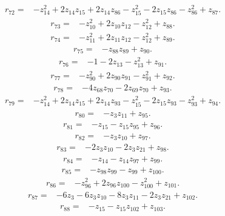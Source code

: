 \begin{align*}
 r_{72}={}&-z_{14}^{2}+2z_{14}z_{15}+2z_{14}z_{86}-z_{15}^{2}-2z_{15}z_{86}-z_{86}^{2}+z_{87} .
\end{align*}
\begin{align*}
 r_{73}={}&-z_{10}^{2}+2z_{10}z_{12}-z_{12}^{2}+z_{88} .
\end{align*}
\begin{align*}
 r_{74}={}&-z_{11}^{2}+2z_{11}z_{12}-z_{12}^{2}+z_{89} .
\end{align*}
\begin{align*}
 r_{75}={}&-z_{88}z_{89}+z_{90} .
\end{align*}
\begin{align*}
 r_{76}={}&-1-2z_{13}-z_{13}^{2}+z_{91} .
\end{align*}
\begin{align*}
 r_{77}={}&-z_{90}^{2}+2z_{90}z_{91}-z_{91}^{2}+z_{92} .
\end{align*}
\begin{align*}
 r_{78}={}&-4z_{68}z_{70}-2z_{69}z_{70}+z_{93} .
\end{align*}
\begin{align*}
 r_{79}={}&-z_{14}^{2}+2z_{14}z_{15}+2z_{14}z_{93}-z_{15}^{2}-2z_{15}z_{93}-z_{93}^{2}+z_{94} .
\end{align*}
\begin{align*}
 r_{80}={}&-z_{3}z_{11}+z_{95} .
\end{align*}
\begin{align*}
 r_{81}={}&-z_{15}-z_{15}z_{95}+z_{96} .
\end{align*}
\begin{align*}
 r_{82}={}&-z_{3}z_{10}+z_{97} .
\end{align*}
\begin{align*}
 r_{83}={}&-2z_{3}z_{10}-2z_{3}z_{21}+z_{98} .
\end{align*}
\begin{align*}
 r_{84}={}&-z_{14}-z_{14}z_{97}+z_{99} .
\end{align*}
\begin{align*}
 r_{85}={}&-z_{98}z_{99}-z_{99}+z_{100} .
\end{align*}
\begin{align*}
 r_{86}={}&-z_{96}^{2}+2z_{96}z_{100}-z_{100}^{2}+z_{101} .
\end{align*}
\begin{align*}
 r_{87}={}&-6z_{3}-6z_{3}z_{10}-8z_{3}z_{11}-2z_{3}z_{21}+z_{102} .
\end{align*}
\begin{align*}
 r_{88}={}&-z_{15}-z_{15}z_{102}+z_{103} .
\end{align*}
